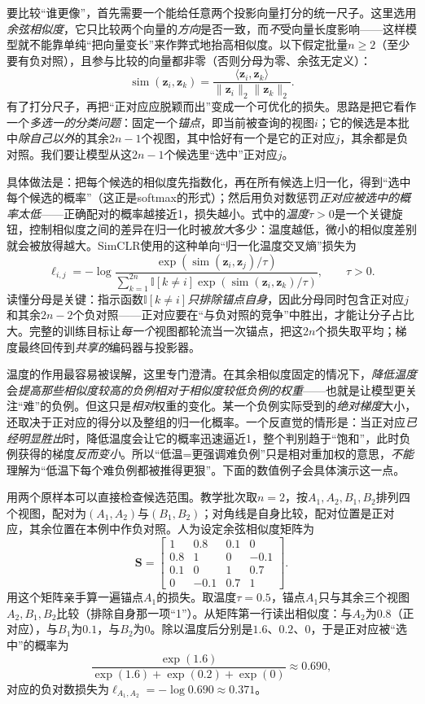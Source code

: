 要比较“谁更像”，首先需要一个能给任意两个投影向量打分的统一尺子。这里选用\emph{余弦相似度}，它只比较两个向量的\emph{方向}是否一致，而\emph{不}受向量长度影响——这样模型就不能靠单纯“把向量变长”来作弊式地抬高相似度。以下假定批量$n\geq2$（至少要有负对照），且参与比较的向量都非零（否则分母为零、余弦无定义）：
\[
  \operatorname{sim}(\bm{z}_i,\bm{z}_k)
  =\frac{\langle\bm{z}_i,\bm{z}_k\rangle}
  {\lVert\bm{z}_i\rVert_2\lVert\bm{z}_k\rVert_2}.
\]
有了打分尺子，再把“正对应应脱颖而出”变成一个可优化的损失。思路是把它看作一个\emph{多选一的分类问题}：固定一个\emph{锚点}，即当前被查询的视图$i$；它的候选是本批中\emph{除自己以外}的其余$2n-1$个视图，其中恰好有一个是它的正对应$j$，其余都是负对照。我们要让模型从这$2n-1$个候选里“选中”正对应$j$。

具体做法是：把每个候选的相似度先指数化，再在所有候选上归一化，得到“选中每个候选的概率”（这正是softmax的形式）；然后用负对数惩罚\emph{正对应被选中的概率太低}——正确配对的概率越接近1，损失越小。式中的\emph{温度}$\tau>0$是一个关键旋钮，控制相似度之间的差异在归一化时被\emph{放大}多少：温度越低，微小的相似度差别就会被放得越大。SimCLR使用的这种单向“归一化温度交叉熵”损失为
\begin{equation}
  \ell_{i,j}
  =-\log
  \frac{\exp\!\left(\operatorname{sim}(\bm{z}_i,\bm{z}_j)/\tau\right)}
  {\displaystyle\sum_{k=1}^{2n}\mathbb{I}[k\neq i]\exp\!\left(\operatorname{sim}(\bm{z}_i,\bm{z}_k)/\tau\right)},
  \qquad \tau>0.
  \label{eq:data-derived-knowledge-simclr}
\end{equation}
读懂分母是关键：指示函数$\mathbb{I}[k\neq i]$\emph{只排除锚点自身}，因此分母同时包含正对应$j$和其余$2n-2$个负对照——正对应要在“与负对照的竞争”中胜出，才能让分子占比大。完整的训练目标让\emph{每一个}视图都轮流当一次锚点，把这$2n$个损失取平均；梯度最终回传到\emph{共享的}编码器与投影器。

温度的作用最容易被误解，这里专门澄清。在其余相似度固定的情况下，\emph{降低温度}会\emph{提高那些相似度较高的负例相对于相似度较低负例的权重}——也就是让模型更关注“难”的负例。但这只是\emph{相对}权重的变化。某一个负例实际受到的\emph{绝对梯度}大小，还取决于正对应的得分以及整组的归一化概率。一个反直觉的情形是：当正对应\emph{已经明显胜出}时，降低温度会让它的概率迅速逼近1，整个判别趋于“饱和”，此时负例获得的梯度\emph{反而变小}。所以“低温=更强调难负例”只是相对重加权的意思，\emph{不能}理解为“低温下每个难负例都被推得更狠”。下面的数值例子会具体演示这一点。

用两个原样本可以直接检查候选范围。教学批次取$n=2$，按$A_1,A_2,B_1,B_2$排列四个视图，配对为$(A_1,A_2)$与$(B_1,B_2)$；对角线是自身比较，配对位置是正对应，其余位置在本例中作负对照。人为设定余弦相似度矩阵为
\[
  \bm{S}=
  \begin{bmatrix}
  1&0.8&0.1&0\\
  0.8&1&0&-0.1\\
  0.1&0&1&0.7\\
  0&-0.1&0.7&1
  \end{bmatrix}.
\]
用这个矩阵亲手算一遍锚点$A_1$的损失。取温度$\tau=0.5$，锚点$A_1$只与其余三个视图$A_2,B_1,B_2$比较（排除自身那一项“1”）。从矩阵第一行读出相似度：与$A_2$为$0.8$（正对应），与$B_1$为$0.1$，与$B_2$为$0$。除以温度后分别是$1.6$、$0.2$、$0$，于是正对应被“选中”的概率为
\[
  \frac{\exp(1.6)}{\exp(1.6)+\exp(0.2)+\exp(0)}\approx0.690,
\]
对应的负对数损失为$\ell_{A_1,A_2}=-\log0.690\approx0.371$。


